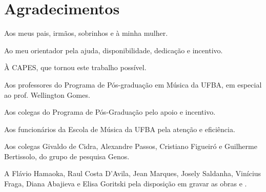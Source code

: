 \chapter*{Agradecimentos}
\label{cha:agradecimentos}

Aos meus pais, irmãos, sobrinhos e à minha mulher.

Ao meu orientador pela ajuda, disponibilidade, dedicação e incentivo.

À CAPES, que tornou este trabalho possível.

Aos professores do Programa de Pós-graduação em Música da UFBA, em
especial ao prof. Wellington Gomes.

Aos colegas do Programa de Pós-Graduação pelo apoio e incentivo.

Aos funcionários da Escola de Música da UFBA pela atenção e
eficiência.

Aos colegas Givaldo de Cidra, Alexandre Passos, Cristiano Figueiró e
Guilherme Bertissolo, do grupo de pesquisa Genos.

A Flávio Hamaoka, Raul Costa D'Avila, Jean Marques, Josely Saldanha,
Vinícius Fraga, Diana Abajieva e Elisa Goritski pela disposição em
gravar as obras  e \obra{}.

